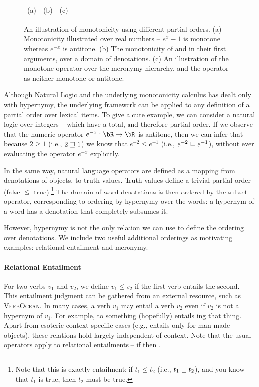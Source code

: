 \begin{figure}
\begin{center}
\begin{tabular}{ccc}
(a) & (b) & (c)
\end{tabular}
\end{center}
\caption{
An illustration of monotonicity using different partial orders.
(a) Monotonicity illustrated over real numbers -- $e^x-1$ is monotone whereas
    $e^{-x}$ is antitone.
(b) The monotonicity of  and  in their first arguments, over
    a domain of denotations.
(c) An illustration of the  monotone operator over the meronymy hierarchy,
    and the operator  as neither monotone or antitone.
}
\end{figure}

Although Natural Logic and the underlying monotonicity calculus has 
  dealt only with hypernymy, the underlying framework
  can be applied to any definition of a partial order over lexical items.
To give a cute example, we can consider a natural logic over integers \cite{key:2014icard-natlog} 
  -- which have a total, and therefore partial order.
If we observe that the numeric operator $e^{-x} : \bR \rightarrow \bR$ is
  antitone, then we can infer that because $2 \geq 1$ (i.e., $2 \sqsupseteq 1$)
  we know that $e^{-2} \leq e^{-1}$ (i.e., $e^{-2} \sqsubseteq e^{-1}$), without
  ever evaluating the operator $e^{-x}$ explicitly.

In the same way, natural language operators are defined as a mapping from
  denotations of objects, to truth values.
Truth values define a trivial partial order (false $\leq$ true).\footnote{
  Note that this is exactly entailment: if \hbox{$t_1 \leq t_2$} 
  (i.e., \hbox{$t_1 \sqsubseteq t_2$}),
  and you know that $t_1$ is true, then $t_2$ must be true.
}
The domain of word denotations is then ordered by the subset operator, corresponding
  to ordering by hypernymy over the words: a hypernym of a word has a denotation
  that completely subsumes it.

However, hypernymy is not the only relation we can use to define the ordering over
  denotations.
We include two useful additional orderings as motivating examples: relational
  entailment and meronymy.

\paragraph{Relational Entailment}
For two verbs $v_1$ and $v_2$, we define $v_1 \leq v_2$ if the first verb
  entails the second.
This entailment judgment can be gathered from an external resource, such as
  \textsc{VerbOcean}\cite{key:chklovski2004verbocean}.
In many cases, a verb $v_1$ may entail a verb $v_2$ even if $v_2$ is not a hypernym of $v_1$.
For example, to  something (hopefully) entails ing that thing.
Apart from esoteric context-specific cases (e.g.,  entails  only
  for man-made objects), these relations hold largely independent of context.
Note that the usual operators apply to relational entailments -- if 
   then .

